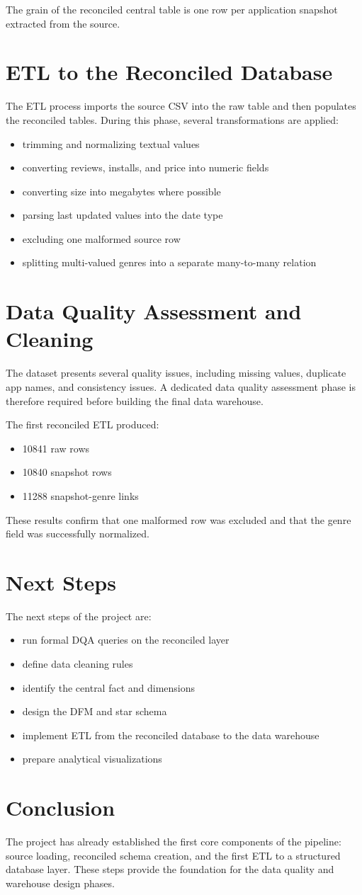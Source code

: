 \documentclass[11pt,a4paper]{article}
\begin{document}
The grain of the reconciled central table is one row per application snapshot extracted from the source.

\section{ETL to the Reconciled Database}
The ETL process imports the source CSV into the raw table and then populates the reconciled tables. During this phase, several transformations are applied:
\begin{itemize}
    \item trimming and normalizing textual values
    \item converting reviews, installs, and price into numeric fields
    \item converting size into megabytes where possible
    \item parsing last updated values into the date type
    \item excluding one malformed source row
    \item splitting multi-valued genres into a separate many-to-many relation
\end{itemize}

\section{Data Quality Assessment and Cleaning}
The dataset presents several quality issues, including missing values, duplicate app names, and consistency issues. A dedicated data quality assessment phase is therefore required before building the final data warehouse.

The first reconciled ETL produced:
\begin{itemize}
    \item 10841 raw rows
    \item 10840 snapshot rows
    \item 11288 snapshot-genre links
\end{itemize}

These results confirm that one malformed row was excluded and that the genre field was successfully normalized.

\section{Next Steps}
The next steps of the project are:
\begin{itemize}
    \item run formal DQA queries on the reconciled layer
    \item define data cleaning rules
    \item identify the central fact and dimensions
    \item design the DFM and star schema
    \item implement ETL from the reconciled database to the data warehouse
    \item prepare analytical visualizations
\end{itemize}

\section{Conclusion}
The project has already established the first core components of the pipeline: source loading, reconciled schema creation, and the first ETL to a structured database layer. These steps provide the foundation for the data quality and warehouse design phases.
\end{document}
